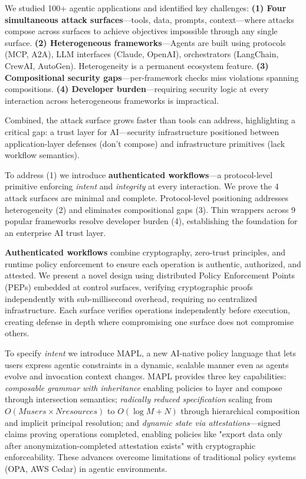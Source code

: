 We studied 100+ agentic applications and identified key challenges: \textbf{(1) Four simultaneous attack surfaces}—tools, data, prompts, context—where attacks compose across surfaces to achieve objectives impossible through any single surface. \textbf{(2) Heterogeneous frameworks}—Agents are built using protocols (MCP, A2A), LLM interfaces (Claude, OpenAI), orchestrators (LangChain, CrewAI, AutoGen). Heterogeneity is a permanent ecosystem feature. \textbf{(3) Compositional security gaps}—per-framework checks miss violations spanning compositions. \textbf{(4) Developer burden}—requiring security logic at every interaction across heterogeneous frameworks is impractical.

Combined, the attack surface grows faster than tools can address, highlighting a critical gap: a trust layer for AI—security infrastructure positioned between application-layer defenses (don't compose) and infrastructure primitives (lack workflow semantics). 

To address (1) we introduce \textbf{authenticated workflows}—a protocol-level primitive enforcing \textit{intent} and \textit{integrity} at every interaction. We prove the 4 attack surfaces are minimal and complete. Protocol-level positioning addresses heterogeneity (2) and eliminates compositional gaps (3). Thin wrappers across 9 popular frameworks resolve developer burden (4), establishing the foundation for an enterprise AI trust layer.

\textbf{Authenticated workflows} combine cryptography, zero-trust principles, and runtime policy enforcement to ensure each operation is authentic, authorized, and attested. We present a novel design using distributed Policy Enforcement Points (PEPs) embedded at control surfaces, verifying cryptographic proofs independently with sub-millisecond overhead, requiring no centralized infrastructure. Each surface verifies operations independently before execution, creating defense in depth where compromising one surface does not compromise others.

To specify \textit{intent} we introduce MAPL, a new AI-native policy language that lets users express agentic constraints in a dynamic, scalable manner even as agents evolve and invocation context changes. MAPL provides three key capabilities: \textit{composable grammar with inheritance} enabling policies to layer and compose through intersection semantics; \textit{radically reduced specification} scaling from $O(M users \times N resources)$ to $O(\log M + N)$ through hierarchical composition and implicit principal resolution; and \textit{dynamic state via attestations}—signed claims proving operations completed, enabling policies like "export data only after anonymization-completed attestation exists" with cryptographic enforceability. 
These advances overcome limitations of traditional policy systems (OPA, AWS Cedar) in agentic environments.


